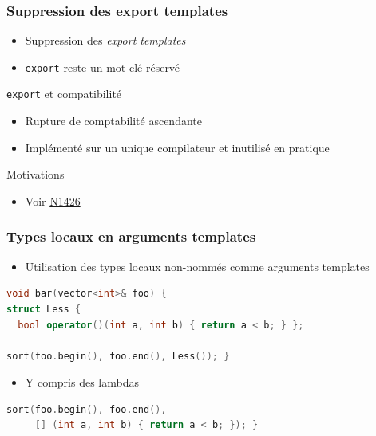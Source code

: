 \documentclass[C++.tex]{subfiles}
\begin{document}
\begin{frame}[fragile]
	\frametitle{Suppression des export templates}
	\begin{itemize}
		\item Suppression des \textit{export templates}
		\item \lstinline|export| reste un mot-clé réservé
	\end{itemize}

	\begin{block}{\lstinline|export| et compatibilité}
		\begin{itemize}
			\item Rupture de comptabilité ascendante
			\item Implémenté sur un unique compilateur et inutilisé en pratique
		\end{itemize}

	\end{block}

	\begin{block}{Motivations}
		\begin{itemize}
			\item Voir \href{http://www.open-std.org/jtc1/sc22/wg21/docs/papers/2003/n1426.pdf}{N1426}
		\end{itemize}

	\end{block}
\end{frame}

\begin{frame}[fragile]
	\frametitle{Types locaux en arguments templates}
	\begin{itemize}
		\item Utilisation des types locaux non-nommés comme arguments templates
	\end{itemize}

	\begin{lstlisting}[language=C++]
void bar(vector<int>& foo) {
struct Less {
  bool operator()(int a, int b) { return a < b; } };

sort(foo.begin(), foo.end(), Less()); }\end{lstlisting}

	\begin{itemize}
		\item Y compris des lambdas
	\end{itemize}

	\begin{lstlisting}[language=C++]
sort(foo.begin(), foo.end(),
     [] (int a, int b) { return a < b; }); }\end{lstlisting}
\end{frame}
\end{document}
